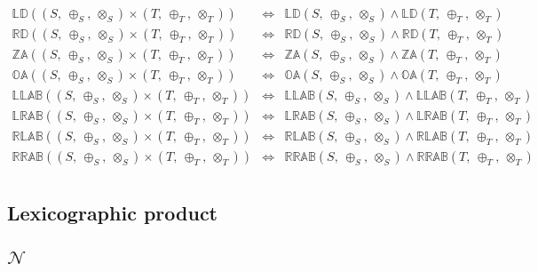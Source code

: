 \documentclass[10pt]{report}
\newcommand{\propname}[1]{{\mathbb{#1}}}
\begin{document}
\[
\begin{array}{rcl} 
\propname{LD}((S,\ \oplus_S,\ \otimes_S) \times (T,\ \oplus_T,\ \otimes_T)) 
   & \Leftrightarrow %
   & \propname{LD}(S,\ \oplus_S,\ \otimes_S) \wedge \propname{LD}(T,\ \oplus_T,\ \otimes_T)\\ 
\propname{RD}((S,\ \oplus_S,\ \otimes_S) \times (T,\ \oplus_T,\ \otimes_T)) 
   & \Leftrightarrow %
   & \propname{RD}(S,\ \oplus_S,\ \otimes_S) \wedge \propname{RD}(T,\ \oplus_T,\ \otimes_T) 
  \\ 
\propname{ZA}((S,\ \oplus_S,\ \otimes_S) \times (T,\ \oplus_T,\ \otimes_T)) 
    & \Leftrightarrow %
    & \propname{ZA}(S,\ \oplus_S,\ \otimes_S) \wedge \propname{ZA}(T,\ \oplus_T,\ \otimes_T)
   \\
\propname{OA}((S,\ \oplus_S,\ \otimes_S) \times (T,\ \oplus_T,\ \otimes_T)) 
    & \Leftrightarrow %
    & \propname{OA}(S,\ \oplus_S,\ \otimes_S) \wedge \propname{OA}(T,\ \oplus_T,\ \otimes_T)
   \\
\propname{LLAB}((S,\ \oplus_S,\ \otimes_S) \times (T,\ \oplus_T,\ \otimes_T)) 
    & \Leftrightarrow %
    & \propname{LLAB}(S,\ \oplus_S,\ \otimes_S) \wedge \propname{LLAB}(T,\ \oplus_T,\ \otimes_T)
    \\
\propname{LRAB}((S,\ \oplus_S,\ \otimes_S) \times (T,\ \oplus_T,\ \otimes_T)) 
    & \Leftrightarrow %
    & \propname{LRAB}(S,\ \oplus_S,\ \otimes_S) \wedge \propname{LRAB}(T,\ \oplus_T,\ \otimes_T)
    \\ 
\propname{RLAB}((S,\ \oplus_S,\ \otimes_S) \times (T,\ \oplus_T,\ \otimes_T)) 
    & \Leftrightarrow %
    & \propname{RLAB}(S,\ \oplus_S,\ \otimes_S) \wedge  \propname{RLAB}(T,\ \oplus_T,\ \otimes_T) 
    \\ 
\propname{RRAB}((S,\ \oplus_S,\ \otimes_S) \times (T,\ \oplus_T,\ \otimes_T)) 
    & \Leftrightarrow %
    & \propname{RRAB}(S,\ \oplus_S,\ \otimes_S) \wedge  \propname{RRAB}(T,\ \oplus_T,\ \otimes_T) 
    \\ 
\end{array} 
\]



\subsection{Lexicographic product} 






\subsection{$\mathcal{N}$} 
\end{document}

